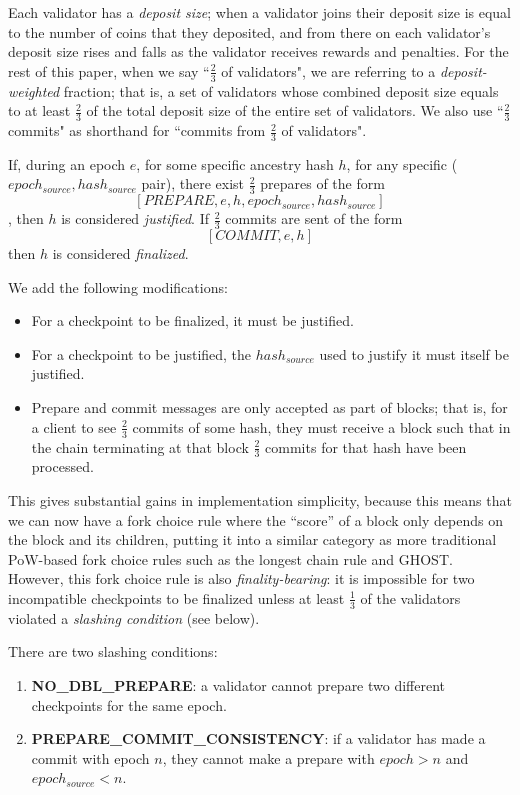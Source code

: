 \documentclass[12pt]{article}
\begin{document}
Each validator has a \textit{deposit size}; when a validator joins their deposit size is equal to the number of coins that they deposited, and from there on each validator's deposit size rises and falls as the validator receives rewards and penalties. For the rest of this paper, when we say ``$\frac{2}{3}$ of validators", we are referring to a \textit{deposit-weighted} fraction; that is, a set of validators whose combined deposit size equals to at least $\frac{2}{3}$ of the total deposit size of the entire set of validators. We also use ``$\frac{2}{3}$ commits" as shorthand for ``commits from $\frac{2}{3}$ of validators".

If, during an epoch $e$, for some specific ancestry hash $h$, for any specific ($epoch_{source}, hash_{source}$ pair), there exist $\frac{2}{3}$ prepares of the form $$[PREPARE, e, h, epoch_{source}, hash_{source}]$$, then $h$ is considered \textit{justified}. If $\frac{2}{3}$ commits are sent of the form $$[COMMIT, e, h]$$ then $h$ is considered \textit{finalized}.

We add the following modifications:

\begin{itemize}
\item For a checkpoint to be finalized, it must be justified.
\item For a checkpoint to be justified, the $hash_{source}$ used to justify it must itself be justified.
\item Prepare and commit messages are only accepted as part of blocks; that is, for a client to see $\frac{2}{3}$ commits of some hash, they must receive a block such that in the chain terminating at that block $\frac{2}{3}$ commits for that hash have been processed.
\end{itemize}

This gives substantial gains in implementation simplicity, because this means that we can now have a fork choice rule where the ``score'' of a block only depends on the block and its children, putting it into a similar category as more traditional PoW-based fork choice rules such as the longest chain rule and GHOST. However, this fork choice rule is also \textit{finality-bearing}: it is impossible for two incompatible checkpoints to be finalized unless at least $\frac{1}{3}$ of the validators violated a \textit{slashing condition} (see below).

There are two slashing conditions:

\begin{enumerate}
\item \textbf{NO\_DBL\_PREPARE}: a validator cannot prepare two different checkpoints for the same epoch.
\item \textbf{PREPARE\_COMMIT\_CONSISTENCY}: if a validator has made a commit with epoch $n$, they cannot make a prepare with $epoch > n$ and $epoch_{source} < n$.
\end{enumerate}
\end{document}
